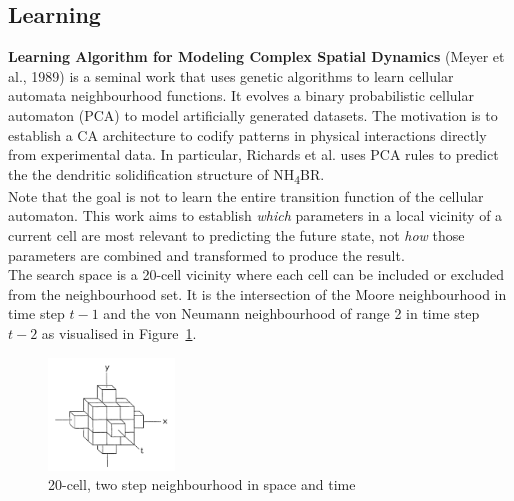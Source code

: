 \subsection{Learning}

\noindent
\textbf{Learning Algorithm for Modeling Complex Spatial Dynamics} (Meyer et al., 1989) \cite{meyer1989learning} is a seminal work that uses genetic algorithms to learn cellular automata neighbourhood functions. It evolves a binary probabilistic cellular automaton (PCA) to model artificially generated datasets. The motivation is to establish a CA architecture to codify patterns in physical interactions directly from experimental data. In particular, Richards et al. \cite{richards1990extracting} uses PCA rules to predict the the dendritic solidification structure of NH\textsubscript{4}BR.\\

Note that the goal is not to learn the entire transition function of the cellular automaton. This work aims to establish \textit{which} parameters in a local vicinity of a current cell are most relevant to predicting the future state, not \textit{how} those parameters are combined and transformed to produce the result.\\

The search space is a 20-cell vicinity where each cell can be included or excluded from the neighbourhood set. It is the intersection of the Moore neighbourhood in time step $t-1$ and the von Neumann neighbourhood of range 2 in time step $t-2$ as visualised in Figure~\ref{fig:20-near}.

\begin{figure}[!h]
\centering
\includegraphics[width=0.3\textwidth]{images/20_neighbourhood.png}
\caption{20-cell, two step neighbourhood in space and time}
\label{fig:20-near}
\end{figure}

